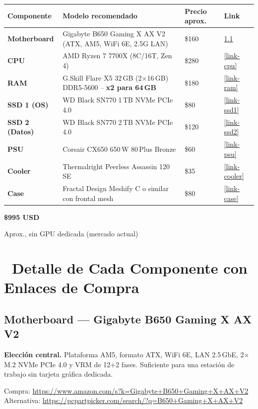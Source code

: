 \documentclass[11pt,a4paper]{article}
\newcommand{\iconotexto}[2]{\textcolor{cyanNeon}{\faIcon{#1}}~#2}
\begin{document}
\begin{longtable}{p{3.2cm} p{6.2cm} p{2.2cm} p{0.6cm}}
\toprule
\textbf{Componente} & \textbf{Modelo recomendado} & \textbf{Precio aprox.} & \textbf{Link} \\
\midrule
\endhead
\bottomrule
\endlastfoot

\textbf{Motherboard} & Gigabyte B650 Gaming X AX V2 (ATX, AM5, WiFi 6E, 2.5G LAN) & \$160 & \ref{link-mb} \\
\textbf{CPU} & AMD Ryzen 7 7700X (8C/16T, Zen 4) & \$280 & \ref{link-cpu} \\
\textbf{RAM} & G.Skill Flare X5 32\,GB (2$\times$16\,GB) DDR5-5600 -- \textbf{x2 para 64\,GB} & \$180 & \ref{link-ram} \\
\textbf{SSD 1 (OS)} & WD Black SN770 1\,TB NVMe PCIe 4.0 & \$80 & \ref{link-ssd1} \\
\textbf{SSD 2 (Datos)} & WD Black SN770 2\,TB NVMe PCIe 4.0 & \$120 & \ref{link-ssd2} \\
\textbf{PSU} & Corsair CX650 650\,W 80\,Plus Bronze & \$60 & \ref{link-psu} \\
\textbf{Cooler} & Thermalright Peerless Assassin 120 SE & \$35 & \ref{link-cooler} \\
\textbf{Case} & Fractal Design Meshify C o similar con frontal mesh & \$80 & \ref{link-case} \\
\bottomrule
\end{longtable}

\begin{tcolorbox}[tarjetaDato, title={\faIcon{coins}~Costo total estimado}]
\centering
{\fontsize{28}{34}\selectfont\bfseries\color{azulNoche}\$995 USD}\par\vspace{4pt}
{\color{grisTexto}\small Aprox., sin GPU dedicada (mercado actual)}
\end{tcolorbox}

\section[Detalle y Compras]{\iconotexto{link}{Detalle de Cada Componente con Enlaces de Compra}}

\subsection{Motherboard --- Gigabyte B650 Gaming X AX V2}
\label{link-mb}
\begin{tcolorbox}[cajaRecomendacion, title={\faIcon{memory}~Placa base}]
\textbf{Elección central.} Plataforma AM5, formato ATX, WiFi 6E, LAN 2.5\,GbE, 2$\times$ M.2 NVMe PCIe 4.0 y VRM de 12$+$2 fases. Suficiente para una estación de trabajo sin tarjeta gráfica dedicada.

Compra: \url{https://www.amazon.com/s?k=Gigabyte+B650+Gaming+X+AX+V2}
Alternativa: \url{https://pcpartpicker.com/search/?q=B650+Gaming+X+AX+V2}
\end{tcolorbox}
\end{document}
